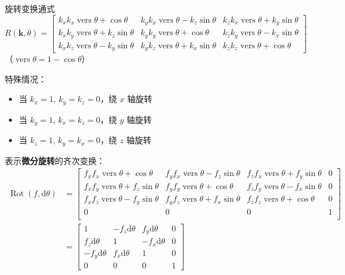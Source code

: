 \begin{note}
    旋转变换通式
    \[
        R(\boldsymbol{k}, \theta) = 
        \begin{bmatrix}
        k_x k_x \operatorname{vers}\theta + \cos\theta & k_y k_x \operatorname{vers}\theta - k_z \sin\theta & k_z k_x \operatorname{vers}\theta + k_y \sin\theta \\
        k_x k_y \operatorname{vers}\theta + k_z \sin\theta & k_y k_y \operatorname{vers}\theta + \cos\theta & k_z k_y \operatorname{vers}\theta - k_x \sin\theta \\
        k_x k_z \operatorname{vers}\theta - k_y \sin\theta & k_y k_z \operatorname{vers}\theta + k_x \sin\theta & k_z k_z \operatorname{vers}\theta + \cos\theta
        \end{bmatrix}
    \]
    （$\operatorname{vers}\theta=1-\cos\theta$）

    特殊情况：
    \begin{itemize}
    \item 当 \( k_x = 1 \), \( k_y = k_z = 0 \)，绕 \(x\) 轴旋转
    \item 当 \( k_y = 1 \), \( k_x = k_z = 0 \)，绕 \(y\) 轴旋转
    \item 当 \( k_z = 1 \), \( k_y = k_x = 0 \)，绕 \(z\) 轴旋转
    \end{itemize}
\end{note}

表示\textbf{微分旋转}的齐次变换：
$$
\begin{aligned}
    \operatorname{Rot}(f, \mathrm{d}\theta) &= 
    \begin{bmatrix}
    f_x f_x \operatorname{vers}\theta + \cos\theta & f_y f_x \operatorname{vers}\theta - f_z \sin\theta & f_z f_x \operatorname{vers}\theta + f_y \sin\theta & 0\\
    f_x f_y \operatorname{vers}\theta + f_z \sin\theta & f_y f_y \operatorname{vers}\theta + \cos\theta & f_z f_y \operatorname{vers}\theta - f_x \sin\theta & 0\\
    f_x f_z \operatorname{vers}\theta - f_y \sin\theta & f_y f_z \operatorname{vers}\theta + f_x \sin\theta & f_z f_z \operatorname{vers}\theta + \cos\theta & 0\\
    0 & 0 & 0 & 1\\
    \end{bmatrix} \\
    & = \begin{bmatrix}
    1 & -f_z \mathrm{d}\theta & f_y \mathrm{d}\theta & 0 \\
    f_z \mathrm{d}\theta & 1 & -f_x \mathrm{d}\theta & 0 \\
    -f_y \mathrm{d}\theta & f_x \mathrm{d}\theta & 1 & 0 \\
    0 & 0 & 0 & 1
    \end{bmatrix}
\end{aligned}
$$

